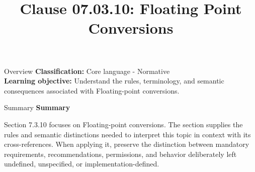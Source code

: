 \documentclass[10pt,letterpaper]{article}
\title{Clause 07.03.10: Floating Point Conversions}
\author{}
\date{}
\begin{document}
\maketitle
\begin{CornellOverviewBox}{Overview}
\textbf{Classification:} Core language - Normative\\[2pt]
\textbf{Learning objective:} Understand the rules, terminology, and semantic consequences associated with Floating-point conversions.
\end{CornellOverviewBox}\begin{CornellSummaryBox}{Summary}
{\sffamily\bfseries\color{Accent} Summary}\par\vspace{3pt}Section 7.3.10 focuses on Floating-point conversions. The section supplies the rules and semantic distinctions needed to interpret this topic in context with its cross-references. When applying it, preserve the distinction between mandatory requirements, recommendations, permissions, and behavior deliberately left undefined, unspecified, or implementation-defined.
\end{CornellSummaryBox}
\end{document}
